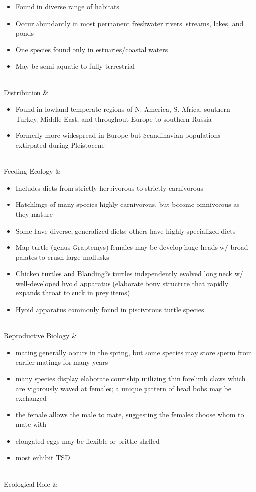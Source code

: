 \begin{center}
\begin{longtabu}
\begin{itemize}[noitemsep]
		\item Found in diverse range of habitats
		\item Occur abundantly in most permanent freshwater rivers, streams, lakes, and ponds
		\item One species found only in estuaries/coastal waters
		\item May be semi-aquatic to fully terrestrial
	\end{itemize}
	\\
	\hline
	Distribution & 
	\begin{itemize}[noitemsep]
		\item Found in lowland temperate regions of N. America, S. Africa, southern Turkey, Middle East, and throughout Europe to southern Russia
		\item Formerly more widespread in Europe but Scandinavian populations extirpated during Pleistocene
	\end{itemize}
	\\
	\hline
	Feeding Ecology & 
	\begin{itemize}[noitemsep]
		\item Includes diets from strictly herbivorous to strictly carnivorous
		\item Hatchlings of many species highly carnivorous, but become omnivorous as they mature
		\item Some have diverse, generalized diets; others have highly specialized diets
		\item Map turtle (genus Graptemys) females may be develop huge heads w/ broad palates to crush large mollusks
		\item Chicken turtles and Blanding?s turtles independently evolved long neck w/ well-developed hyoid apparatus (elaborate bony structure that rapidly expands throat to suck in prey items)
		\item Hyoid apparatus commonly found in piscivorous turtle species
	\end{itemize}
	\\
	\hline
	Reproductive Biology & 
	\begin{itemize}[noitemsep]
		\item mating generally occurs in the spring, but some species may store sperm from earlier matings for many years
		\item many species display elaborate courtship utilizing thin forelimb claws which are vigorously waved at females; a unique pattern of head bobs may be exchanged
		\item the female allows the male to mate, suggesting the females choose whom to mate with
		\item elongated eggs may be flexible or brittle-shelled
		\item most exhibit TSD
	\end{itemize}
	\\
	\hline
	Ecological Role &
	

\end{longtabu}
\end{center}
